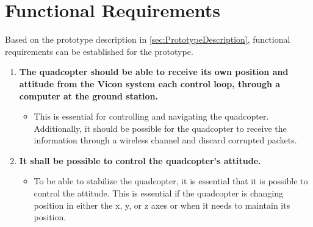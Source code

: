 \chapter{Functional Requirements}
\label{ch:functionalRequirements}
Based on the prototype description in  \autoref{sec:PrototypeDescription}, functional requirements can be established for the prototype.

\begin{enumerate}[label=\textbf{\arabic*})]

\item \textbf{The quadcopter should be able to receive its own position and attitude from the Vicon system each control loop, through a computer at the ground station.}
\begin{itemize}
\item[] %
This is essential for controlling and navigating the quadcopter. Additionally, it should be possible for the quadcopter to receive the information through a wireless channel and discard corrupted packets.  %
\end{itemize}



\item \textbf{It shall be possible to control the quadcopter's attitude.}
\begin{itemize}
\item[] To be able to stabilize the quadcopter, it is essential that it is possible to control the attitude. This is essential if the quadcopter is changing position in either the x, y, or z axes or when it needs to maintain its position. 
\end{itemize}


\end{enumerate}
